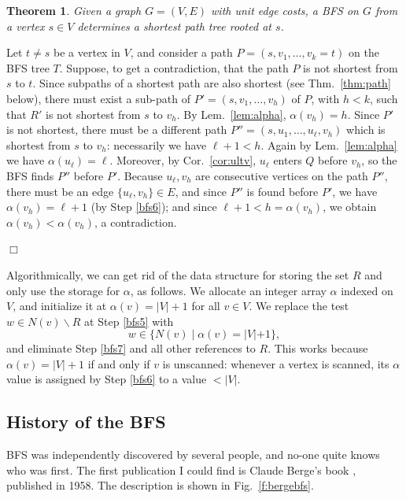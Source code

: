 \documentclass[a4paper]{book}
\theoremstyle{changebreak}                %
\newtheorem{thm}[result]{Theorem}
\newenvironment{proof}
 {{\sl Proof.}\hspace*{1 ex}}%
 {{\nopagebreak\hspace*{\fill}$\Box$\par\vspace{12pt}}}
\begin{document}
\begin{thm}
Given a graph $G=(V,E)$ with unit edge costs, a BFS on $G$ from a
vertex $s\in V$ determines a shortest path tree rooted at $s$.
\end{thm}
\begin{proof}
Let $t\not=s$ be a vertex in $V$, and consider a path
$P=(s,v_1,\ldots,v_k=t)$ on the BFS tree $T$. Suppose, to get a
contradiction, that the path $P$ is not shortest from $s$ to
$t$. Since subpaths of a shortest path are also shortest (see
Thm.~\ref{thm:path} below), there must exist a sub-path of
$P'=(s,v_1,\ldots,v_{h})$ of $P$, with $h<k$, such that $R'$ is not
shortest from $s$ to $v_h$. By Lem.~\ref{lem:alpha},
$\alpha(v_h)=h$. Since $P'$ is not shortest, there must be a different
path $P''=(s,u_1,\ldots,u_\ell,v_h)$ which is shortest from $s$ to
$v_h$: necessarily we have $\ell+1<h$. Again by Lem.~\ref{lem:alpha}
we have $\alpha(u_\ell)=\ell$. Moreover, by Cor.~\ref{cor:ultv},
$u_\ell$ enters $Q$ before $v_h$, so the BFS finds $P''$ before
$P'$. Because $u_\ell,v_h$ are consecutive vertices on the path $P''$,
there must be an edge $\{u_\ell,v_h\}\in E$, and since $P''$ is found
before $P'$, we have $\alpha(v_h)=\ell+1$ (by Step \ref{bfs6}); and
since $\ell+1<h=\alpha(v_h)$, we obtain $\alpha(v_h)<\alpha(v_h)$, a
contradiction.
\end{proof}

Algorithmically, we can get rid of the data structure for storing the
set $R$ and only use the storage for $\alpha$, as
follows. We allocate an integer array $\alpha$
indexed on $V$, and initialize it at $\alpha(v)=|V|+1$ for all $v\in
V$. We replace the test $w\in N(v)\smallsetminus R$ at Step \ref{bfs5}
with
\begin{equation*}
  w\in \{ N(v) \;|\; \alpha(v) = |V|+1 \},
\end{equation*}
and eliminate Step \ref{bfs7} and all other references to $R$. This
works because $\alpha(v)=|V|+1$ if and only if $v$ is
unscanned: whenever a vertex is scanned, its $\alpha$ value is
assigned by Step \ref{bfs6} to a value $<|V|$.

\subsection{History of the BFS}
BFS was independently discovered by several people, and no-one quite
knows who was first. The first publication I could find is Claude
Berge's book \cite{bergebook2}, published in 1958. The description is
shown in Fig.~\ref{f:bergebfs}.
\end{document}
